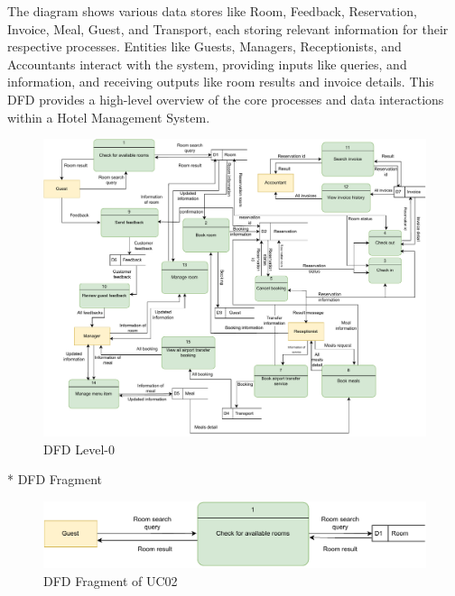 The diagram shows various data stores like Room, Feedback, Reservation, Invoice, Meal, Guest, and Transport, each storing relevant information for their respective processes. Entities like Guests, Managers, Receptionists, and Accountants interact with the system, providing inputs like queries, and information, and receiving outputs like room results and invoice details. This DFD provides a high-level overview of the core processes and data interactions within a Hotel Management System.
\begin{figure}[H]
    \includegraphics[width=1\linewidth]{img/dfd-0.drawio.pdf}
    \caption{DFD Level-0}
    \label{fig:DFD Level-0}
\end{figure}
* DFD Fragment
\begin{figure}[H]
    \includegraphics[width=1\linewidth]{img/dfd1.pdf}
    \caption{DFD Fragment of UC02}
    \label{fig:DFD Fragment of UC02}
\end{figure}
